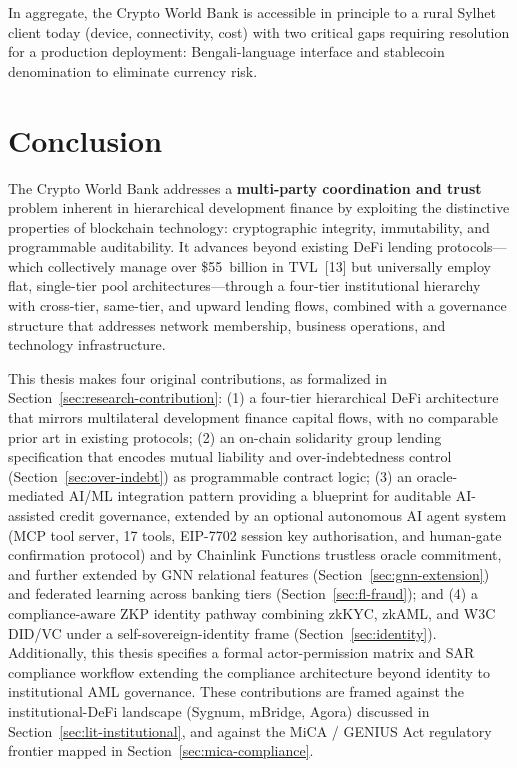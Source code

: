 \documentclass[12pt,a4paper]{report}
\begin{document}
In aggregate, the Crypto World Bank is accessible in principle to a rural Sylhet client today (device, connectivity, cost) with two critical gaps requiring resolution for a production deployment: Bengali-language interface and stablecoin denomination to eliminate currency risk.


\chapter{Conclusion}

The Crypto World Bank addresses a \textbf{multi-party coordination and trust} problem inherent in hierarchical development finance by exploiting the distinctive properties of blockchain technology: cryptographic integrity, immutability, and programmable auditability. It advances beyond existing DeFi lending protocols---which collectively manage over \$55~billion in TVL~[13] but universally employ flat, single-tier pool architectures---through a four-tier institutional hierarchy with cross-tier, same-tier, and upward lending flows, combined with a governance structure that addresses network membership, business operations, and technology infrastructure.

This thesis makes four original contributions, as formalized in Section~\ref{sec:research-contribution}: (1) a four-tier hierarchical DeFi architecture that mirrors multilateral development finance capital flows, with no comparable prior art in existing protocols; (2) an on-chain solidarity group lending specification that encodes mutual liability and over-indebtedness control (Section~\ref{sec:over-indebt}) as programmable contract logic; (3) an oracle-mediated AI/ML integration pattern providing a blueprint for auditable AI-assisted credit governance, extended by an optional autonomous AI agent system (MCP tool server, 17 tools, EIP-7702 session key authorisation, and human-gate confirmation protocol) and by Chainlink Functions trustless oracle commitment, and further extended by GNN relational features (Section~\ref{sec:gnn-extension}) and federated learning across banking tiers (Section~\ref{sec:fl-fraud}); and (4) a compliance-aware ZKP identity pathway combining zkKYC, zkAML, and W3C DID/VC under a self-sovereign-identity frame (Section~\ref{sec:identity}). Additionally, this thesis specifies a formal actor-permission matrix and SAR compliance workflow extending the compliance architecture beyond identity to institutional AML governance. These contributions are framed against the institutional-DeFi landscape (Sygnum, mBridge, Agora) discussed in Section~\ref{sec:lit-institutional}, and against the MiCA / GENIUS Act regulatory frontier mapped in Section~\ref{sec:mica-compliance}.
\end{document}
